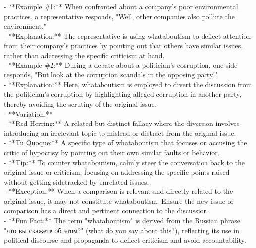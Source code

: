 \documentclass[a4paper,12pt,single,pdftex]{scrartcl}
\begin{document}
    
      - **Example \#1:** When confronted about a company's poor environmental practices, a representative responds, "Well, other companies also pollute the environment."
    \\

    
      - **Explanation:** The representative is using whataboutism to deflect attention from their company’s practices by pointing out that others have similar issues, rather than addressing the specific criticism at hand.
    \\

    
      - **Example \#2:** During a debate about a politician's corruption, one side responds, "But look at the corruption scandals in the opposing party!"
    \\

    
      - **Explanation:** Here, whataboutism is employed to divert the discussion from the politician's corruption by highlighting alleged corruption in another party, thereby avoiding the scrutiny of the original issue.
    \\

    
      - **Variation:**
    \\

    
        - **Red Herring:** A related but distinct fallacy where the diversion involves introducing an irrelevant topic to mislead or distract from the original issue.
    \\

    
        - **Tu Quoque:** A specific type of whataboutism that focuses on accusing the critic of hypocrisy by pointing out their own similar faults or behavior.
    \\

    
      - **Tip:** To counter whataboutism, calmly steer the conversation back to the original issue or criticism, focusing on addressing the specific points raised without getting sidetracked by unrelated issues.
    \\

    
      - **Exception:** When a comparison is relevant and directly related to the original issue, it may not constitute whataboutism. Ensure the new issue or comparison has a direct and pertinent connection to the discussion.
    \\

    
      - **Fun Fact:** The term "whataboutism" is derived from the Russian phrase "что вы скажете об этом?" (what do you say about this?), reflecting its use in political discourse and propaganda to deflect criticism and avoid accountability.
    \\
\end{document}
